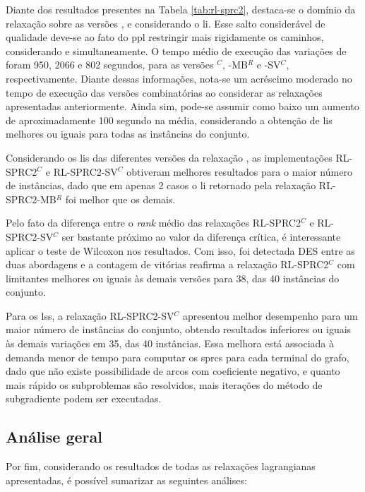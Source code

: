 Diante  dos  resultados presentes  na  Tabela  \ref{tab:rl-sprc2}, destaca-se  o
domínio da relaxação {\rlq} sobre as  versões {\rlu, \rld} e {\rlt} considerando
o \gls{li}.  Esse salto considerável de  qualidade deve-se ao fato  do \gls{ppl}
restringir  mais  rigidamente os  caminhos,  considerando  {\delay} e  {\jitter}
simultaneamente. O  tempo médio de execução  das variações de {\rlq}  foram 950,
2066 e 802 segundos, para  as versões {\rlq}$^C$, {\rlq}-MB$^R$ e {\rlq}-SV$^C$,
respectivamente.  Diante dessas  informações, nota-se  um acréscimo  moderado no
tempo  de  execução  das  versões  combinatórias  ao  considerar  as  relaxações
apresentadas anteriormente. Ainda sim, pode-se  assumir como baixo um aumento de
aproximadamente  100 segundo  na  média, considerando  a  obtenção de  \gls{li}s
melhores ou iguais para todas as instâncias do conjunto.

Considerando  os  \gls{li}s  das  diferentes versões  da  relaxação  {\rlq},  as
implementações RL-SPRC2$^C$ e RL-SPRC2-SV$^C$ obtiveram melhores resultados para
o maior número  de instâncias, dado que  em apenas 2 casos  o \gls{li} retornado
pela relaxação RL-SPRC2-MB$^R$ foi melhor que os demais.

Pelo fato  da diferença entre o  {\em rank} médio das  relaxações RL-SPRC2$^C$ e
RL-SPRC2-SV$^C$  ser  bastante   próximo  ao  valor  da   diferença  crítica,  é
interessante aplicar o teste de Wilcoxon nos resultados. Com isso, foi detectada
DES  entre as  duas abordagens  e a  contagem de  vitórias reafirma  a relaxação
RL-SPRC2$^C$ com limitantes melhores ou iguais às demais versões para 38, das 40
instâncias do conjunto.

Para os \gls{ls}s, a relaxação RL-SPRC2-SV$^C$ apresentou melhor desempenho para
um  maior número  de instâncias  do conjunto,  obtendo resultados  inferiores ou
iguais às demais variações em 35, das 40 instâncias. Essa melhora está associada
à demanda  menor de  tempo para  computar os \gls{sprc}s  para cada  terminal do
grafo, dado  que não existe possibilidade  de arcos com coeficiente  negativo, e
quanto mais rápido  os subproblemas são resolvidos, mais iterações  do método de
subgradiente podem ser executadas.

\subsection{Análise geral}

Por  fim,  considerando  os  resultados  de  todas  as  relaxações  lagrangianas
apresentadas, é possível sumarizar as seguintes análises:

